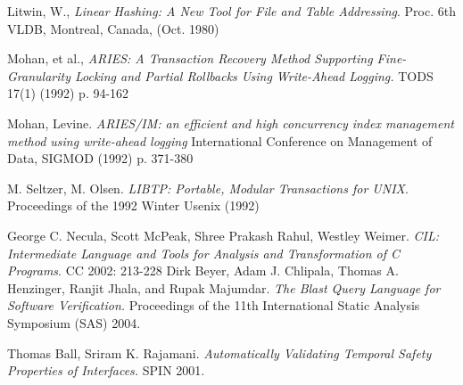 \documentclass[10pt,letterpaper,twocolumn,english]{article}
\begin{document}
\begin{thebibliography}{99}
\begin{small}





 Litwin, W., {\em Linear Hashing: A New Tool for File and Table Addressing}. Proc. 6th VLDB, Montreal, Canada, (Oct. 1980) %

 Mohan, et al., {\em ARIES: A Transaction Recovery Method Supporting Fine-Granularity Locking and Partial Rollbacks Using Write-Ahead Logging.} TODS 17(1) (1992) p. 94-162


 Mohan, Levine. {\em ARIES/IM: an efficient and high concurrency index management method using write-ahead logging} International Conference on Management of Data, SIGMOD (1992) p. 371-380


%
 M. Seltzer, M. Olsen. {\em LIBTP: Portable, Modular Transactions for UNIX}. Proceedings of the 1992 Winter Usenix (1992)

 George C. Necula, Scott McPeak, Shree Prakash Rahul, Westley Weimer. {\em CIL: Intermediate Language and Tools for Analysis and Transformation of C Programs}. CC 2002: 213-228
 Dirk Beyer, Adam J. Chlipala, Thomas A. Henzinger, Ranjit Jhala, and Rupak Majumdar. {\em The Blast Query Language for Software Verification.} Proceedings of the 11th International Static Analysis Symposium (SAS) 2004.

 Thomas Ball, Sriram K. Rajamani.  {\em Automatically Validating Temporal Safety Properties of Interfaces.} SPIN 2001.


\end{small}
\end{thebibliography}
\end{document}
